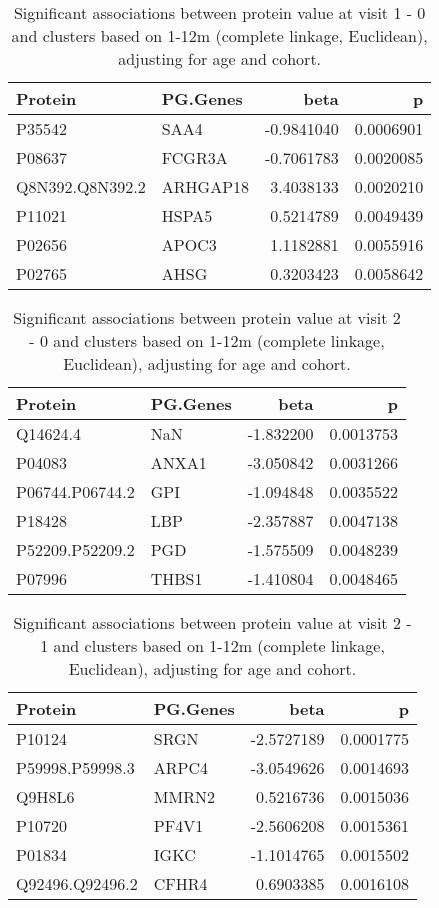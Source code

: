 \documentclass[
]{article}
\begin{document}
\begin{table}

\caption{\label{tab:v10}Significant associations between protein value at visit 1 - 0 and clusters based on 1-12m (complete linkage, Euclidean), adjusting for age and cohort.}
\centering
\begin{tabular}[t]{l|l|r|r}
\hline
Protein & PG.Genes & beta & p\\
\hline
P35542 & SAA4 & -0.9841040 & 0.0006901\\
\hline
P08637 & FCGR3A & -0.7061783 & 0.0020085\\
\hline
Q8N392.Q8N392.2 & ARHGAP18 & 3.4038133 & 0.0020210\\
\hline
P11021 & HSPA5 & 0.5214789 & 0.0049439\\
\hline
P02656 & APOC3 & 1.1182881 & 0.0055916\\
\hline
P02765 & AHSG & 0.3203423 & 0.0058642\\
\hline
\end{tabular}
\end{table}
\begin{table}

\caption{\label{tab:v20}Significant associations between protein value at visit 2 - 0 and clusters based on 1-12m (complete linkage, Euclidean), adjusting for age and cohort.}
\centering
\begin{tabular}[t]{l|l|r|r}
\hline
Protein & PG.Genes & beta & p\\
\hline
Q14624.4 & NaN & -1.832200 & 0.0013753\\
\hline
P04083 & ANXA1 & -3.050842 & 0.0031266\\
\hline
P06744.P06744.2 & GPI & -1.094848 & 0.0035522\\
\hline
P18428 & LBP & -2.357887 & 0.0047138\\
\hline
P52209.P52209.2 & PGD & -1.575509 & 0.0048239\\
\hline
P07996 & THBS1 & -1.410804 & 0.0048465\\
\hline
\end{tabular}
\end{table}
\begin{table}

\caption{\label{tab:v21}Significant associations between protein value at visit 2 - 1 and clusters based on 1-12m (complete linkage, Euclidean), adjusting for age and cohort.}
\centering
\begin{tabular}[t]{l|l|r|r}
\hline
Protein & PG.Genes & beta & p\\
\hline
P10124 & SRGN & -2.5727189 & 0.0001775\\
\hline
P59998.P59998.3 & ARPC4 & -3.0549626 & 0.0014693\\
\hline
Q9H8L6 & MMRN2 & 0.5216736 & 0.0015036\\
\hline
P10720 & PF4V1 & -2.5606208 & 0.0015361\\
\hline
P01834 & IGKC & -1.1014765 & 0.0015502\\
\hline
Q92496.Q92496.2 & CFHR4 & 0.6903385 & 0.0016108\\
\hline
\end{tabular}
\end{table}
\end{document}
